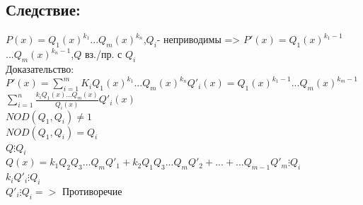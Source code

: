 \documentclass[12pt]{article}
\begin{document}
    \subsection{Следствие:}
    \noindent $P(x)=Q_1(x)^{k_1}$$... Q_m(x)^{k_n}$,$Q_i$- неприводимы => $P'(x)=Q_1(x)^{k_1-1}$$... Q_m(x)^{k_n-1}$,$Q$ вз./пр. с $Q_i$
    \\Доказательство:
    \\$P'(x)=\sum\limits _{i=1}^{m} K_iQ_1(x)^{k_1}$$...Q_m(x)^{k_n}$$Q'_i(x)=Q_1(x)^{k_1-1}$$...Q_m(x)^{k_m-1}$$\sum\limits _{i=1}^{n}\frac{k_iQ_1(x)...Q_m(x)}{Q_i(x)}Q'_i(x)$
        \\$NOD(Q_1,Q_i)\neq 1$
    \\$NOD(Q_1,Q_i) = Q_i$
        \\$Q \vdots Q_i$
    \\$Q(x)= k_1Q_2Q_3...Q_mQ'_1+k_2Q_1Q_3...Q_mQ'_2+...+...Q_{m-1}Q'_m\vdots Q_i$
        \\$k_iQ'_i\vdots Q_i$
    \\$Q'_i\vdots Q_i =>$ Противоречие
\end{document}
